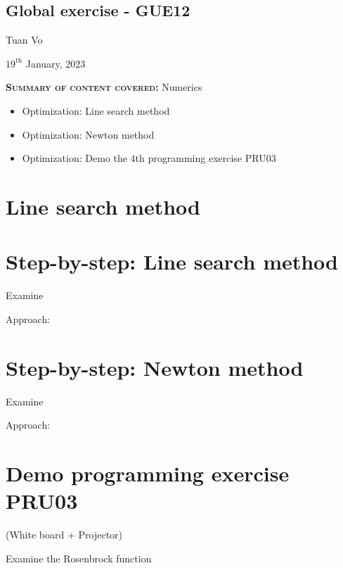 \documentclass[12pt]{article}
\begin{document}
\begin{center}
	\section*{Global exercise - GUE12}
\end{center}
\begin{center}
	Tuan Vo
\end{center}
\begin{center}
	$19^{\text{th}}$ January, 2023
\end{center}
\textbf{\textsc{Summary of content covered:}} Numerics
\begin{itemize}
	\item[\checkmark] Optimization: Line search method
	\item[\checkmark] Optimization: Newton method
	\item[\checkmark] Optimization: Demo the $4$th programming exercise PRU03
\end{itemize}
\section{Line search method}

\clearpage
\section{Step-by-step: Line search method}
\begin{exampleboxed}
	Examine
\end{exampleboxed}
Approach:\\

\clearpage
\section{Step-by-step: Newton method}
\begin{exampleboxed}
	Examine
\end{exampleboxed}
Approach:\\

\clearpage
\section{Demo programming exercise PRU03}
 (White board + Projector)
 \begin{exampleboxed}
	Examine the Rosenbrock function
\end{exampleboxed}



% 
\end{document}
